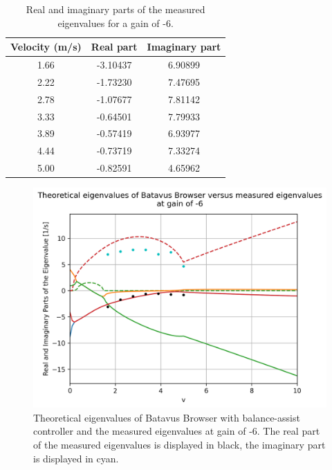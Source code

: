\documentclass[12pt]{article}
\begin{document}
\begin{table}[]
    \centering
    \caption{Real and imaginary parts of the measured eigenvalues for a gain of -6.}
    \label{table-eigenvalues-gain-6}
    \begin{tabular}{c|c|c}
        \textbf{Velocity (m/s)} & \textbf{Real part} & \textbf{Imaginary part} \\ \hline
        1.66                    & -3.10437           & 6.90899                 \\
        2.22                    & -1.73230           & 7.47695                 \\
        2.78                    & -1.07677           & 7.81142                 \\
        3.33                    & -0.64501           & 7.79933                 \\
        3.89                    & -0.57419           & 6.93977                 \\
        4.44                    & -0.73719           & 7.33274                 \\
        5.00                    & -0.82591           & 4.65962                
    \end{tabular}
\end{table}

\begin{figure}
    \centering
    \includegraphics[width=\columnwidth]{figures/gain-6-batavus-without-rider.png}
    \caption{Theoretical eigenvalues of Batavus Browser with balance-assist controller and the measured eigenvalues at gain of -6. The real part of the measured eigenvalues is displayed in black, the imaginary part is displayed  in cyan.}
    \label{gain-6-batavus-without-rider}
\end{figure}
\end{document}
